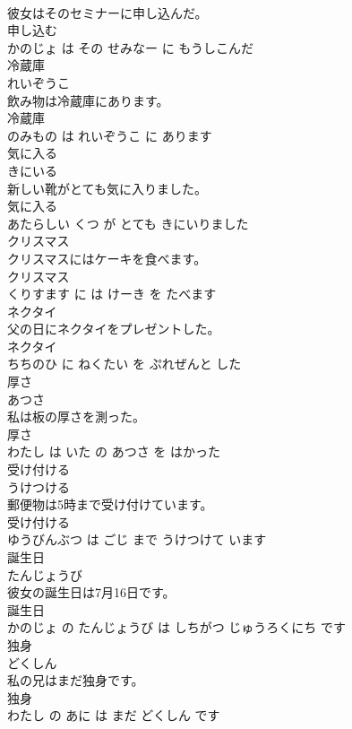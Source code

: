 \documentclass[8pt]{extreport}
\begin{document}
\begin{CJK}{UTF8}{min}
\\	彼女はそのセミナーに申し込んだ。	
\\	申し込む 
\\	かのじょ は その せみなー に もうしこんだ			
\\	冷蔵庫	
\\	れいぞうこ			
\\	飲み物は冷蔵庫にあります。	
\\	冷蔵庫 
\\	のみもの は れいぞうこ に あります			
\\	気に入る	
\\	きにいる			
\\	新しい靴がとても気に入りました。	
\\	気に入る 
\\	あたらしい くつ が とても きにいりました			
\\	クリスマス	
\\	クリスマスにはケーキを食べます。	
\\	クリスマス 
\\	くりすます に は けーき を たべます			
\\	ネクタイ	
\\	父の日にネクタイをプレゼントした。	
\\	ネクタイ 
\\	ちちのひ に ねくたい を ぷれぜんと した			
\\	厚さ	
\\	あつさ			
\\	私は板の厚さを測った。	
\\	厚さ 
\\	わたし は いた の あつさ を はかった			
\\	受け付ける	
\\	うけつける			
\\	郵便物は5時まで受け付けています。	
\\	受け付ける 
\\	ゆうびんぶつ は ごじ まで うけつけて います			
\\	誕生日	
\\	たんじょうび			
\\	彼女の誕生日は7月16日です。	
\\	誕生日 
\\	かのじょ の たんじょうび は しちがつ じゅうろくにち です			
\\	独身	
\\	どくしん			
\\	私の兄はまだ独身です。	
\\	独身 
\\	わたし の あに は まだ どくしん です			

\end{CJK}
\end{document}
